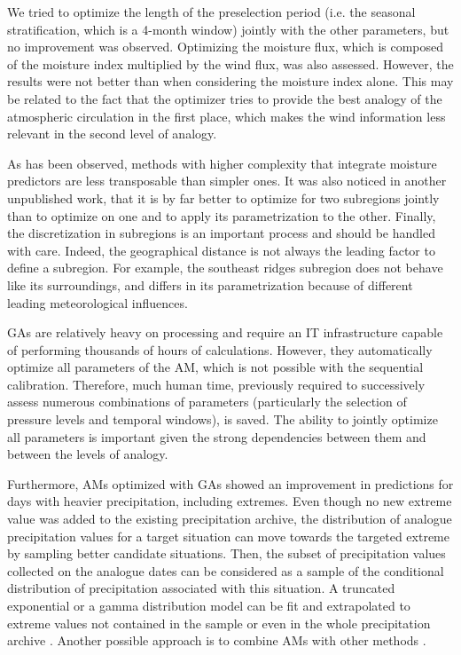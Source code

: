 \documentclass[review]{elsarticle}
\begin{document}
We tried to optimize the length of the preselection period (i.e. the seasonal stratification, which is a 4-month window) jointly with the other parameters, but no improvement was observed. Optimizing the moisture flux, which is composed of the moisture index multiplied by the wind flux, was also assessed. However, the results were not better than when considering the moisture index alone. This may be related to the fact that the optimizer tries to provide the best analogy of the atmospheric circulation in the first place, which makes the wind information less relevant in the second level of analogy.

As has been observed, methods with higher complexity that integrate moisture predictors are less transposable than simpler ones. It was also noticed in another unpublished work, that it is by far better to optimize for two subregions jointly than to optimize on one and to apply its parametrization to the other. Finally, the discretization in subregions is an important process and should be handled with care. Indeed, the geographical distance is not always the leading factor to define a subregion. For example, the southeast ridges subregion does not behave like its surroundings, and differs in its parametrization because of different leading meteorological influences.

GAs are relatively heavy on processing and require an IT infrastructure capable of performing thousands of hours of calculations. However, they automatically optimize all parameters of the AM, which is not possible with the sequential calibration. Therefore, much human time, previously required to successively assess numerous combinations of parameters (particularly the selection of pressure levels and temporal windows), is saved. The ability to jointly optimize all parameters is important given the strong dependencies between them and between the levels of analogy.

Furthermore, AMs optimized with GAs showed an improvement in predictions for days with heavier precipitation, including extremes. Even though no new extreme value was added to the existing precipitation archive, the distribution of analogue precipitation values for a target situation can move towards the targeted extreme by sampling better candidate situations. Then, the subset of precipitation values collected on the analogue dates can be considered as a sample of the conditional distribution of precipitation associated with this situation. A truncated exponential or a gamma distribution model can be fit and extrapolated to extreme values not contained in the sample or even in the whole precipitation archive \citep{Obled2002}. Another possible approach is to combine AMs with other methods \citep[e.g.][]{Chardon2014}.
\end{document}
